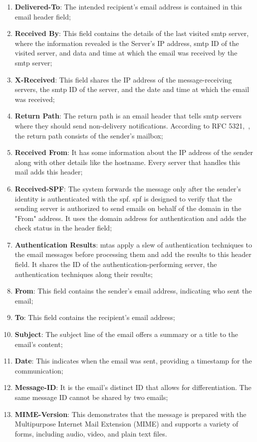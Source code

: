 \begin{enumerate}[label=\Alph*]
    \item \textbf{Delivered-To}: The intended recipient's email address is contained in this email header field;
    \item \textbf{Received By}: This field contains the details of the last visited \ac{smtp} server, where the information revealed is the Server's IP address, \ac{smtp} ID of the visited server, and data and time at which the email was received by the \ac{smtp} server;
    \item \textbf{X-Received}: This field shares the IP address of the message-receiving servers, the \ac{smtp} ID of the server, and the date and time at which the email was received;
    \item \textbf{Return Path}: The return path is an email header that tells \ac{smtp} servers where they should send non-delivery notifications. According to RFC 5321,~\cite{rfc5321}, the return path consists of the sender’s mailbox;
    \item \textbf{Received From}: It has some information about the IP address of the sender along with other details like the hostname. Every server that handles this mail adds this header;
    \item \textbf{Received-SPF}: The system forwards the message only after the sender's identity is authenticated with the \ac{spf}. \ac{spf} is designed to verify that the sending server is authorized to send emails on behalf of the domain in the "From" address. It uses the domain address for authentication and adds the check status in the header field; 
    \item \textbf{Authentication Results}: \ac{mtas} apply a slew of authentication techniques to the email messages before processing them and add the results to this header field. It shares the ID of the authentication-performing server, the authentication techniques along their results;
    \item \textbf{From}: This field contains the sender's email address, indicating who sent the email;
    \item \textbf{To}: This field contains the recipient's email address;
    \item \textbf{Subject}: The subject line of the email offers a summary or a title to the email's content;
    \item \textbf{Date}: This indicates when the email was sent, providing a timestamp for the communication;
    \item \textbf{Message-ID}: It is the email's distinct ID that allows for differentiation. The same message ID cannot be shared by two emails;
    \item \textbf{MIME-Version}: This demonstrates that the message is prepared with the Multipurpose Internet Mail Extension (MIME) and supports a variety of forms, including audio, video, and plain text files.
\end{enumerate}


